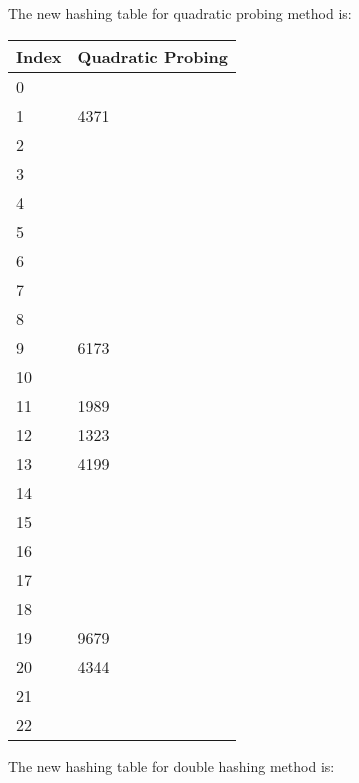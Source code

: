 \documentclass[12pt]{article}
\begin{document}
\begin{enumerate}
The new hashing table for quadratic probing method is:

\small{

	\begin{tabular}{| p{10mm}  | p{20mm} |}
	\hline
		Index & Quadratic Probing\\ \hline
		0 & \\ \hline
		1 & 4371 \\ \hline		
		2 & \\ \hline
		3 & \\ \hline
		4 & \\ \hline
		5 & \\ \hline 
		6 & \\ \hline
		7 & \\ \hline
		8 & \\ \hline
		9 & 6173\\ \hline
		10 & \\ \hline
		11 & 1989 \\ \hline
		12 & 1323 \\ \hline
		13 & 4199 \\ \hline
		14 & \\ \hline
		15 & \\ \hline
		16 & \\ \hline
		17 & \\ \hline
		18 & \\ \hline
		19 & 9679\\ \hline
		20 & 4344 \\ \hline
		21 & \\ \hline
		22 & \\ \hline
	\end{tabular}
}

The new hashing table for double hashing method is:

\small{

}
\end{enumerate}
\end{document}
